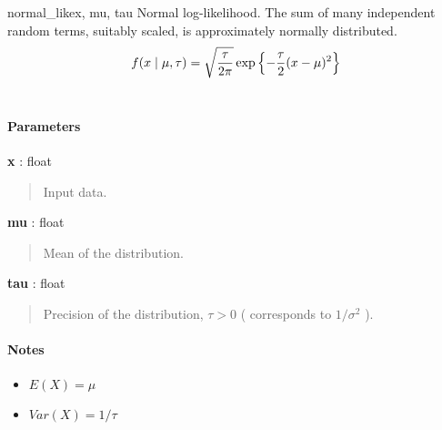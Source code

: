 \hypertarget{pymc.distributions.normal_like}{}
\begin{funcdesc}{normal\_like}{x, mu, tau}
Normal log-likelihood. The sum of many independent random terms, suitably scaled, is approximately normally distributed.
\begin{gather}
\begin{split}f(x \mid \mu, \tau) = \sqrt{\frac{\tau}{2\pi}} \exp\left\{ -\frac{\tau}{2} (x-\mu)^2 \right\}\end{split}\notag\\\begin{split}\end{split}\notag
\end{gather}\paragraph{Parameters}\begin{paramlist}

\item[] \textbf{x} : float
\begin{quote}

Input data.
\end{quote}

\item[] \textbf{mu} : float
\begin{quote}

Mean of the distribution.
\end{quote}

\item[] \textbf{tau} : float
\begin{quote}

Precision of the distribution, $\tau>0$ ( corresponds to $1/\sigma^2$ ).
\end{quote}
\end{paramlist}
\paragraph{Notes}
\begin{itemize}
\item {}
$E(X) = \mu$

\item {}
$Var(X) = 1/\tau$

\end{itemize}
\end{funcdesc}

